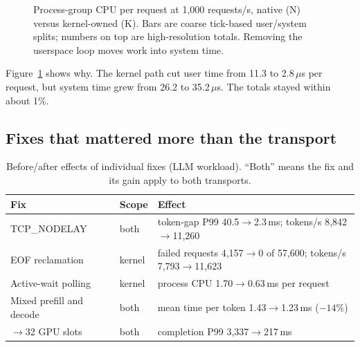 \documentclass[sigconf,nonacm]{acmart}
\newcommand{\us}{\,$\mu$s}
\begin{document}
\begin{figure}[t]
\centering
{}
\caption{Process-group CPU per request at 1,000 requests/s, native (N) versus
kernel-owned (K). Bars are coarse tick-based user/system splits; numbers on
top are high-resolution totals. Removing the userspace loop moves work into
system time.}
\label{fig:cpu}
\end{figure}

Figure~\ref{fig:cpu} shows why. The kernel path cut user time from 11.3 to
2.8\us{} per request, but system time grew from 26.2 to 35.2\us. The totals
stayed within about 1\%.

\subsection{Fixes that mattered more than the transport}
\label{sec:fixes}

\begin{table}[t]
\centering
\small
\caption{Before/after effects of individual fixes (LLM workload). ``Both''
means the fix and its gain apply to both transports.}
\label{tab:fixes}
\begin{tabular}{@{}>{\raggedright\arraybackslash}p{}l>{\raggedright\arraybackslash}p{}@{}}
\toprule
Fix & Scope & Effect \\
\midrule
TCP\_NODELAY & both & token-gap P99 40.5$\to$2.3\,ms; tokens/s 8,842$\to$11,260 \\
EOF reclamation & kernel & failed requests 4,157$\to$0 of 57,600; tokens/s 7,793$\to$11,623 \\
Active-wait polling & kernel & process CPU 1.70$\to$0.63\,ms per request \\
Mixed prefill and decode~\cite{sarathi} & both & mean time per token 1.43$\to$1.23\,ms ($-14\%$) \\
16$\to$32 GPU slots & both & completion P99 3,337$\to$217\,ms \\
\bottomrule
\end{tabular}
\end{table}
\end{document}
